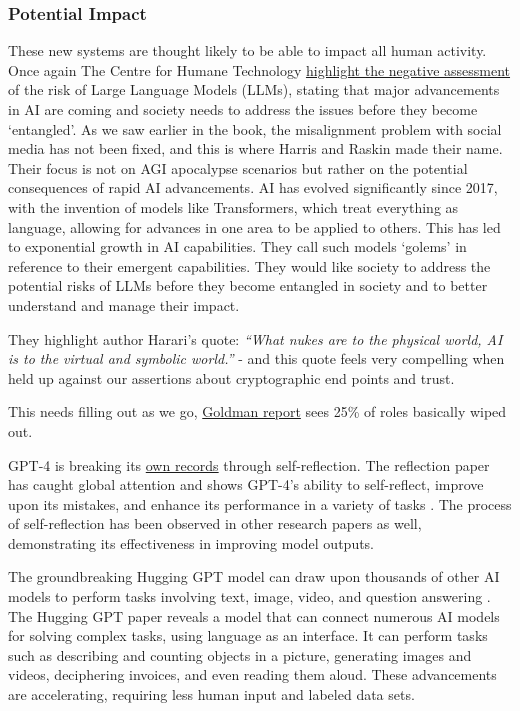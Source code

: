 \subsubsection{Potential Impact}
These new systems are thought likely to be able to impact all human activity. Once again The Centre for Humane Technology \href{https://www.humanetech.com/key-issues}{highlight the negative assessment} of the risk of Large Language Models (LLMs), stating that major advancements in AI are coming and society needs to address the issues before they become `entangled'. As we saw earlier in the book, the misalignment problem with social media has not been fixed, and this is where Harris and Raskin made their name. Their focus is not on AGI apocalypse scenarios but rather on the potential consequences of rapid AI advancements. AI has evolved significantly since 2017, with the invention of models like Transformers, which treat everything as language, allowing for advances in one area to be applied to others. This has led to exponential growth in AI capabilities. They call such models `golems' in reference to their emergent capabilities. They would like society to address the potential risks of LLMs before they become entangled in society and to better understand and manage their impact.\par
They highlight author \cite{harari2014sapiens} Harari's quote: \textit{``What nukes are to the physical world, AI is to the virtual and symbolic world.''} - and this quote feels very compelling when held up against our assertions about cryptographic end points and trust.\par
This needs filling out as we go, \href{https://www.key4biz.it/wp-content/uploads/2023/03/Global-Economics-Analyst_-The-Potentially-Large-Effects-of-Artificial-Intelligence-on-Economic-Growth-Briggs_Kodnani.pdf}{Goldman report} sees 25\% of roles basically wiped out.\par 
GPT-4 is breaking its \href{https://nanothoughts.substack.com/p/reflecting-on-reflexion}{own records} through self-reflection. The reflection paper has caught global attention and shows GPT-4's ability to self-reflect, improve upon its mistakes, and enhance its performance in a variety of tasks \cite{shinn2023reflexion}. The process of self-reflection has been observed in other research papers as well, demonstrating its effectiveness in improving model outputs.\par
The groundbreaking Hugging GPT model can draw upon thousands of other AI models to perform tasks involving text, image, video, and question answering \cite{shen2023hugginggpt}. The Hugging GPT paper reveals a model that can connect numerous AI models for solving complex tasks, using language as an interface. It can perform tasks such as describing and counting objects in a picture, generating images and videos, deciphering invoices, and even reading them aloud. These advancements are accelerating, requiring less human input and labeled data sets.\par
